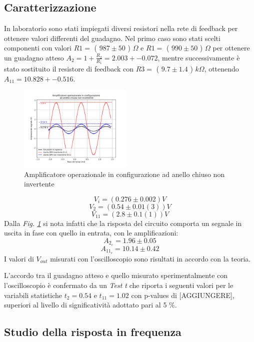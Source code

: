 \documentclass[journal]{IEEEtran}
\begin{document}
\subsection{\textbf{Caratterizzazione}}
In laboratorio sono stati impiegati diversi resistori nella rete di feedback per ottenere valori differenti del guadagno. Nel primo caso sono stati scelti componenti con valori
$R1 =$ ( $987 \pm 50$ ) $\Omega$ e $R1 =$ ( $990 \pm 50$ ) $\Omega$ 
per ottenere un guadagno atteso 
$A_2 = 1 + \frac{R_2}{R_1} =2.003 +- 0.072$, 
mentre successivamente è stato sostituito il resistore di feedback con 
$R3 =$ ( $9.7 \pm 1.4$ ) $k\Omega$, ottenendo $A_{11} = 10.828 +- 0.516 $.
\begin{figure}[H]%
\begin {center}
\includegraphics[width=0.48\textwidth]{analysis/output/OPA-closed-loop-non-inv-G2-11.pdf}
\caption{Amplificatore operazionale in configurazione ad anello chiuso non invertente}
\label{fig:g2-11}
\end {center}
\end{figure}
\[V_i = (0.276 \pm 0.002) V\]
\[V_2 = (0.54 \pm 0.01(3)) V\]
\[V_11 = (2.8 \pm 0.1(1)) V\]
Dalla \textit{Fig. \ref{fig:g2-11}} si nota infatti che la risposta del circuito comporta un segnale in uscita in fase con quello in entrata, con le amplificazioni:
\[A_{2_c} = 1.96 \pm 0.05\]
\[A_{11_c} = 10.14 \pm 0.42\]
 I valori di $V_{out}$ misurati con l'oscilloscopio sono risultati in accordo con la teoria.

L'accordo tra il guadagno atteso e quello misurato sperimentalmente con l'oscilloscopio è confermato da un \textit{Test t} che riporta i seguenti valori per le variabili statistiche $t_2 = 0.54$ e $t_{11} = 1.02$ con p-values di [AGGIUNGERE], superiori al livello di significatività adottato pari al 5 \%.

\subsection{Studio della risposta in frequenza}
\end{document}

